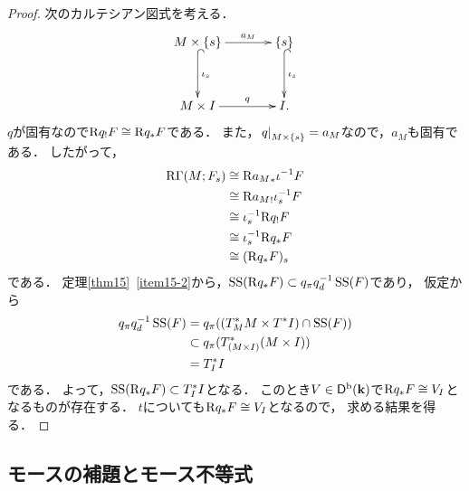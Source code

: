 \begin{proof}
    次のカルテシアン図式を考える．
    \[
        \vcenter{\xymatrix@C=36pt@R=36pt{
        M\times\{s\}
        \ar[r]^-{a_M}
        \ar@{^{(}->}[d]^-{\iota_s}
        &
        \{s\}
        \ar@{^{(}->}[d]^-{\iota_s}\\
        M\times I
        \ar[r]^-{q}
        &
        I.
    }}\]
    \(q\)が固有なので\(\Rder{q_!}F\cong\Rder{q_{\ast}}F\)である．
    また，\(\mres[q]{M\times\{s\}}=a_M\)なので，\(a_M\)も固有である．
    したがって，
    \begin{align*}
        \RG(M;F_s)
        &\cong\Rder{{a_M}_{\ast}}\iota^{-1}F\\
        &\cong\Rder{{a_M}_{!}}\iota_{s}^{-1}F\\
        &\cong\iota_{s}^{-1}\Rder{{q}_{!}}F\\
        &\cong\iota_{s}^{-1}\Rder{{q}_{\ast}}F\\
        &\cong(\Rder{{q}_{\ast}}F)_{s}
    \end{align*}
    である．
    定理\ref{thm15}~\eqref{item15-2}から，\(
        \muS(\Rder{q_{\ast}}F)
        \subset 
        \mpb[q]\mdiff[q]^{-1}\muS(F)
    \)であり，
    仮定から
    \begin{align*}
        \mpb[q]\mdiff[q]^{-1}\muS(F)
        &=\mpb[q]((\cotz[M]\times\cotb[I])\cap\muS(F))\\
        &\subset \mpb[q](\cotz[(M\times I)])\\
        &= \cotz[I]
    \end{align*}
    である．
    よって，\(\muS(\Rder{q_{\ast}}F)\subset\cotz[I]\)となる．
    このとき\(V\in\Dompb(\kk)\)で\(\Rder{q_{\ast}}F\cong V_I\)となるものが存在する．
    \(t\)についても\(\Rder{q_{\ast}}F\cong V_I\)となるので，
    求める結果を得る．
\end{proof}





\subsection{モースの補題とモース不等式{\cite[5.4節]{KS90}}}

